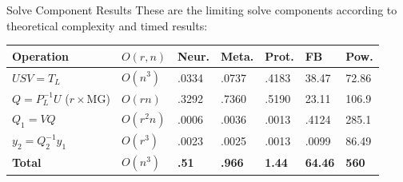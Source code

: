 \documentclass[xcolor=dvipsnames,10pt]{beamer}
\begin{document}
\begin{frame}{Solve Component Results}
These are the limiting solve components according to theoretical complexity and timed results: 

\begin{center}
\renewcommand{\arraystretch}{1.5}
    \begin{tabular}{ | l | l | l | l | l | l | l |}
    \hline
    \textbf{Operation} & \textbf{$O(r,n)$} & \textbf{Neur.} & \textbf{Meta.} & \textbf{Prot.} & \textbf{FB} & \textbf{Pow.} \\ \hline
    $USV = T_L$ & $O(n^3)$ & .0334 & .0737 & .4183 & 38.47 & 72.86  \\ \hline
    $Q = P_L^{-1}U$ ($r\times$MG) & $O(rn)$ & .3292 & .7360 & .5190 & 23.11 & 106.9  \\ \hline
    $Q_1 = VQ$ & $O(r^2 n)$ & .0006 & .0036 & .0013 & .4124 & 285.1 \\ \hline
    $y_2 = Q_2^{-1}y_1$ & $O(r^3)$ & .0023 & .0025 & .0013 & .0099 & 86.49 \\ \hline
    \textbf{Total} & \textbf{$O(n^3)$} & \textbf{.51} & \textbf{.966} & \textbf{1.44} & \textbf{64.46} & \textbf{560} \\
    \hline
    \end{tabular}
    \normalsize
\end{center}
\end{frame}
\end{document}
